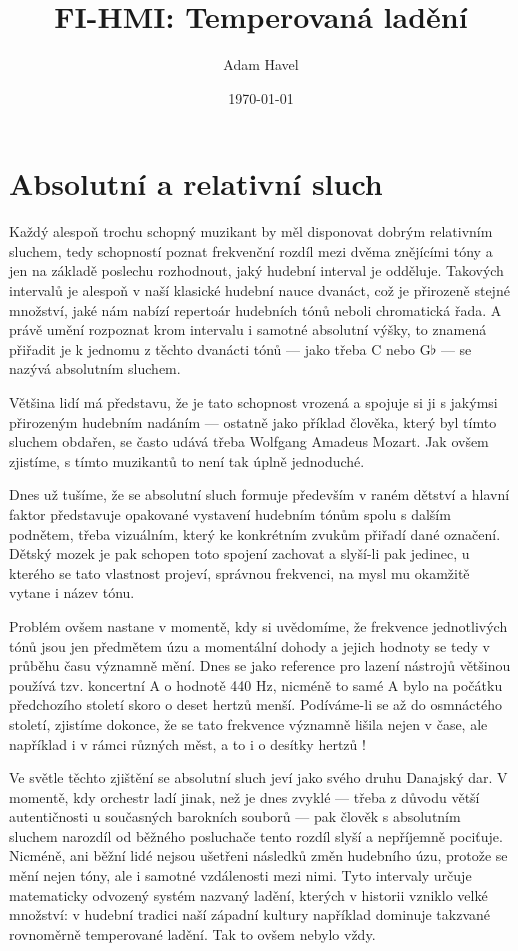 \documentclass[12pt]{article}
\title{FI-HMI: Temperovaná ladění}
\date{\today}
\author{Adam Havel}
\begin{document}
\maketitle

\pagebreak

\section{Absolutní a relativní sluch}

Každý alespoň trochu schopný muzikant by měl disponovat dobrým relativním sluchem, tedy schopností poznat frekvenční rozdíl mezi dvěma znějícími tóny a jen na základě poslechu rozhodnout, jaký hudební interval je odděluje. Takových intervalů je alespoň v naší klasické hudební nauce dvanáct, což je přirozeně stejné množství, jaké nám nabízí repertoár hudebních tónů neboli chromatická řada. A právě umění rozpoznat krom intervalu i samotné absolutní výšky, to znamená přiřadit je k jednomu z těchto dvanácti tónů — jako třeba C nebo G$\flat$ — se nazývá absolutním sluchem.

Většina lidí má představu, že je tato schopnost vrozená a spojuje si ji s jakýmsi přirozeným hudebním nadáním — ostatně jako příklad člověka, který byl tímto sluchem obdařen, se často udává třeba Wolfgang Amadeus Mozart. Jak ovšem zjistíme, s tímto  muzikantů to není tak úplně jednoduché.

Dnes už tušíme, že se absolutní sluch formuje především v raném dětství a hlavní faktor představuje opakované vystavení hudebním tónům spolu s dalším podnětem, třeba vizuálním, který ke konkrétním zvukům přiřadí dané označení. Dětský mozek je pak schopen toto spojení zachovat a slyší-li pak jedinec, u kterého se tato vlastnost projeví, správnou frekvenci, na mysl mu okamžitě vytane i název tónu.

Problém ovšem nastane v momentě, kdy si uvědomíme, že frekvence jednotlivých tónů jsou jen předmětem úzu a momentální dohody a jejich hodnoty se tedy v průběhu času významně mění. Dnes se jako reference pro lazení nástrojů většinou používá tzv. koncertní A o hodnotě 440 Hz, nicméně to samé A bylo na počátku předchozího století skoro o deset hertzů menší. Podíváme-li se až do osmnáctého století, zjistíme dokonce, že se tato frekvence významně lišila nejen v čase, ale například i v rámci různých měst, a to i o desítky hertzů \cite{wiki_pitch}!

Ve světle těchto zjištění se absolutní sluch jeví jako svého druhu Danajský dar. V momentě, kdy orchestr ladí jinak, než je dnes zvyklé — třeba z důvodu větší autentičnosti u současných barokních souborů — pak člověk s absolutním sluchem narozdíl od běžného posluchače tento rozdíl slyší a nepříjemně pociťuje. Nicméně, ani běžní lidé nejsou ušetřeni následků změn hudebního úzu, protože se mění nejen tóny, ale i samotné vzdálenosti mezi nimi. Tyto intervaly určuje matematicky odvozený systém nazvaný ladění, kterých v historii vzniklo velké množství: v hudební tradici naší západní kultury například dominuje takzvané rovnoměrně temperované ladění. Tak to ovšem nebylo vždy.
\end{document}
